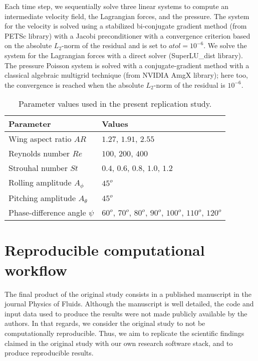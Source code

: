 Each time step, we sequentially solve three linear systems to compute an intermediate velocity field, the Lagrangian forces, and the pressure.
The system for the velocity is solved using a stabilized bi-conjugate gradient method (from PETSc library) with a Jacobi preconditioner with a convergence criterion based on the absolute $L_2$-norm of the residual and is set to $atol = 10^{-6}$.
We solve the system for the Lagrangian forces with a direct solver (SuperLU\_dist library).
The pressure Poisson system is solved with a conjugate-gradient method with a classical algebraic multigrid technique (from NVIDIA AmgX library); here too, the convergence is reached when the absolute $L_2$-norm of the residual is $10^{-6}$.

\begin{table}
  \centering
  \begin{tabular}{ll}
    \hline\hline
    Parameter & Values \\
    \hline
    Wing aspect ratio $AR$ & $1.27$, $1.91$, $2.55$ \\
    Reynolds number $Re$ & $100$, $200$, $400$ \\
    Strouhal number $St$ & $0.4$, $0.6$, $0.8$, $1.0$, $1.2$ \\
    Rolling amplitude $A_\phi$ & $45^o$ \\
    Pitching amplitude $A_\theta$ & $45^o$ \\
    Phase-difference angle $\psi$ & $60^o$, $70^o$, $80^o$, $90^o$, $100^o$, $110^o$, $120^o$ \\
    \hline\hline
  \end{tabular}
  \caption{Parameter values used in the present replication study.}
  \label{tab:parameters}
\end{table}

\section{Reproducible computational workflow}

The final product of the original study consists in a published manuscript in the journal Physics of Fluids.
Although the manuscript is well detailed, the code and input data used to produce the results were not made publicly available by the authors.
In that regards, we consider the original study to not be computationally reproducible.
Thus, we aim to replicate the scientific findings claimed in the original study with our own research software stack, and to produce reproducible results.

